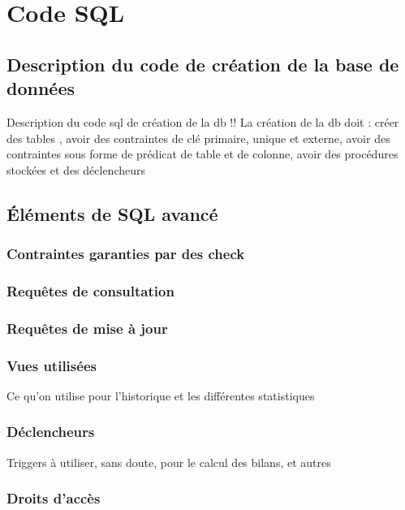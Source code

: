 \documentclass[a4paper,12pt]{article}
\begin{document}
\section{Code SQL}

\subsection{Description du code de création de la base de données}

Description du code sql de création de la db 
!! La création de la db doit : créer des tables , avoir des contraintes de clé primaire, unique et externe, avoir des contraintes sous forme de prédicat de table et de colonne, avoir des procédures stockées et des déclencheurs

\subsection{Éléments de SQL avancé}

\subsubsection{Contraintes garanties par des check}

\subsubsection{Requêtes de consultation}

\subsubsection{Requêtes de mise à jour}


\subsubsection{Vues utilisées}

Ce qu'on utilise pour l'historique et les différentes statistiques

\subsubsection{Déclencheurs}

Triggers à utiliser, sans doute, pour le calcul des bilans, et autres 

\subsubsection{Droits d'accès}
\end{document}
